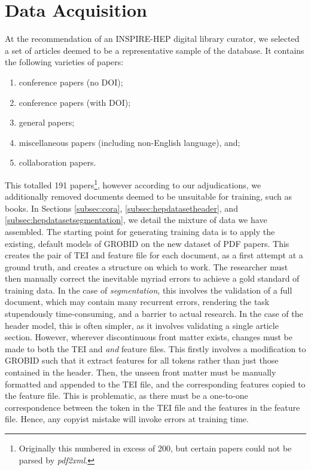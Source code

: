 \section{Data Acquisition}
\label{sec:data}

At the recommendation of an INSPIRE-HEP digital library curator, we selected a set of articles deemed to be a representative sample of the database. It contains the following varieties of papers:

\begin{enumerate}
\item conference papers (no DOI);
\item conference papers (with DOI);
\item general papers;
\item miscellaneous papers (including non-English language), and;
\item collaboration papers.
\end{enumerate}

This totalled 191 papers\footnote{Originally this numbered in excess of 200, but certain papers could not be parsed by \emph{pdf2xml}.}, however according to our adjudications, we additionally removed documents deemed to be unsuitable for training, such as books. In Sections \ref{subsec:cora}, \ref{subsec:hepdatasetheader}, and \ref{subsec:hepdatasetsegmentation}, we detail the mixture of data we have assembled. The starting point for generating training data is to apply the existing, default models of GROBID on the new dataset of PDF papers. This creates the pair of TEI and feature file for each document, as a first attempt at a ground truth, and creates a structure on which to work. The researcher must then manually correct the inevitable myriad errors to achieve a gold standard of training data. In the case of \emph{segmentation}, this involves the validation of a full document, which may contain many recurrent errors, rendering the task stupendously time-consuming, and a barrier to actual research. In the case of the header model, this is often simpler, as it involves validating a single article section. However, wherever discontinuous front matter exists, changes must be made to both the TEI and \emph{and} feature files. This firstly involves a modification to GROBID such that it extract features for all tokens rather than just those contained in the header. Then, the unseen front matter must be manually formatted and appended to the TEI file, and the corresponding features copied to the feature file. This is problematic, as there must be a one-to-one correspondence between the token in the TEI file and the features in the feature file. Hence, any copyist mistake will invoke errors at training time.

